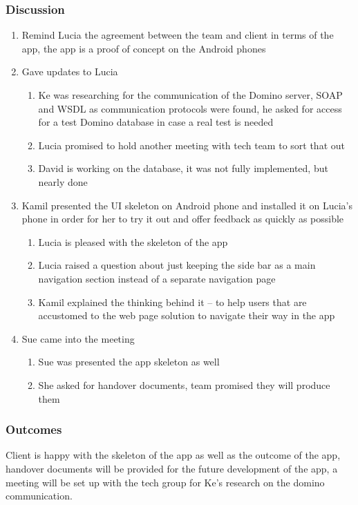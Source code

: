 \documentclass[12pt,a4paper,oneside,titlepage]{article}
\begin{document}
\subsubsection{Discussion}
\begin{enumerate}
	\item Remind Lucia the agreement between the team and client in terms of the app, the app is a proof of concept on the Android phones 
	\item Gave updates to Lucia 
	\begin{enumerate}
		\item Ke was researching for the communication of the Domino server, SOAP and WSDL as communication protocols were found, he asked for access for a test Domino database in case a real test is needed 
		\item Lucia promised to hold another meeting with tech team to sort that out 
		\item David is working on the database, it was not fully implemented, but nearly done 
	\end{enumerate}
	\item Kamil presented the UI skeleton on Android phone and installed it on Lucia’s phone in order for her to try it out and offer feedback as quickly as possible 
	\begin{enumerate}
		\item Lucia is pleased with the skeleton of the app 
		\item Lucia raised a question about just keeping the side bar as a main navigation section instead of a separate navigation page 
		\item Kamil explained the thinking behind it – to help users that are accustomed to the web page solution to navigate their way in the app 
	\end{enumerate}
	\item Sue came into the meeting 
	\begin{enumerate}
		\item Sue was presented the app skeleton as well 
		\item She asked for handover documents, team promised they will produce them
	\end{enumerate}
\end{enumerate}


\subsubsection{Outcomes}
Client is happy with the skeleton of the app as well as the outcome of the app, handover documents will be provided for the future development of the app, a meeting will be set up with the tech group for Ke’s research on the domino communication.
\end{document}
